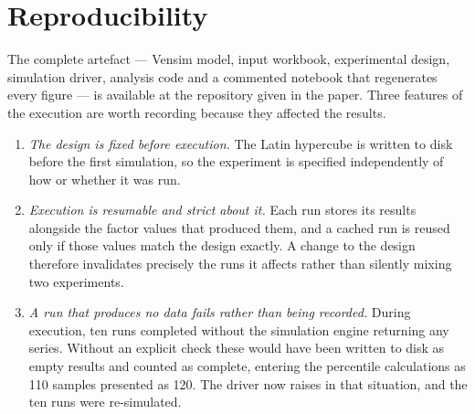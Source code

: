 \documentclass[11pt]{article}
\begin{document}
\section{Reproducibility}
\label{sm:repro}

The complete artefact --- Vensim model, input workbook, experimental design,
simulation driver, analysis code and a commented notebook that regenerates every
figure --- is available at the repository given in the paper. Three features of the
execution are worth recording because they affected the results.

\begin{enumerate}
  \item \emph{The design is fixed before execution.} The Latin hypercube is written
    to disk before the first simulation, so the experiment is specified
    independently of how or whether it was run.
  \item \emph{Execution is resumable and strict about it.} Each run stores its
    results alongside the factor values that produced them, and a cached run is
    reused only if those values match the design exactly. A change to the design
    therefore invalidates precisely the runs it affects rather than silently mixing
    two experiments.
  \item \emph{A run that produces no data fails rather than being recorded.} During
    execution, ten runs completed without the simulation engine returning any
    series. Without an explicit check these would have been written to disk as empty
    results and counted as complete, entering the percentile calculations as 110
    samples presented as 120. The driver now raises in that situation, and the ten
    runs were re-simulated.
\end{enumerate}



\end{document}
